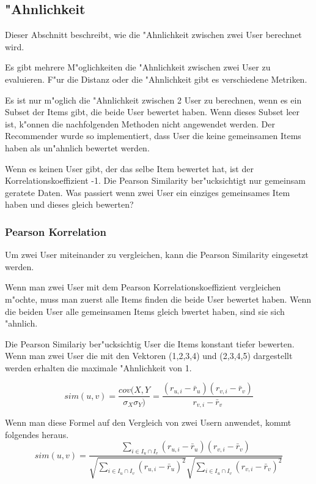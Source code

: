 \documentclass[a4paper, 12pt]{article}
\begin{document}
\subsection{"Ahnlichkeit}

Dieser Abschnitt beschreibt, wie die "Ahnlichkeit zwischen zwei User berechnet wird. 

Es gibt mehrere M"oglichkeiten die "Ahnlichkeit zwischen zwei User zu evaluieren. F"ur die Distanz oder die "Ahnlichkeit gibt es verschiedene Metriken. 

Es ist nur m"oglich die "Ahnlichkeit zwischen 2 User zu berechnen, wenn es ein Subset der Items gibt, die beide User bewertet haben. Wenn dieses Subset leer ist, k"onnen die nachfolgenden Methoden nicht angewendet werden. Der Recommender wurde so implementiert, dass User die keine gemeinsamen Items haben als un"ahnlich bewertet werden.

Wenn es keinen User gibt, der das selbe Item bewertet hat, ist der Korrelationskoeffizient -1.
Die Pearson Similarity ber"ucksichtigt nur gemeinsam geratete Daten.
Was passiert wenn zwei User ein einziges gemeinsames Item haben und dieses gleich bewerten?

\subsubsection{Pearson Korrelation}
\label{sec:pearsoncorrelation}

Um zwei User miteinander zu vergleichen, kann die Pearson Similarity eingesetzt werden.

Wenn man zwei User mit dem Pearson Korrelationskoeffizient vergleichen m"ochte, muss man zuerst alle Items finden die beide User bewertet haben. Wenn die beiden User alle gemeinsamen Items gleich bwertet haben, sind sie sich "ahnlich.

Die Pearson Similariy ber"ucksichtig User die Items konstant tiefer bewerten. Wenn man zwei User die mit den Vektoren (1,2,3,4) und (2,3,4,5) dargestellt werden erhalten die maximale "Ahnlichkeit von 1.

\begin{equation}
 sim(u,v) = \frac{cov(X,Y}{\sigma_X \sigma_Y)} = \frac{(r_{u,i} - \bar{r}_u)(r_{v,i} - \bar{r}_v)}{r_{v,i} - \bar{r}_v}    
\end{equation}

Wenn man diese Formel auf den Vergleich von zwei Usern anwendet, kommt folgendes heraus.
\begin{equation}
 sim(u,v) = \frac{\sum_{i \in I_u \cap I_v} (r_{u,i} - \bar{r}_u)(r_{v,i} - \bar{r}_v)}{\sqrt{\sum_{i \in I_u \cap I_v}(r_{u,i} - \bar{r}_u)^2}\sqrt{\sum_{i \in I_u \cap I_v}(r_{v,i} - \bar{r}_v)^2}}
\end{equation}
\end{document}
